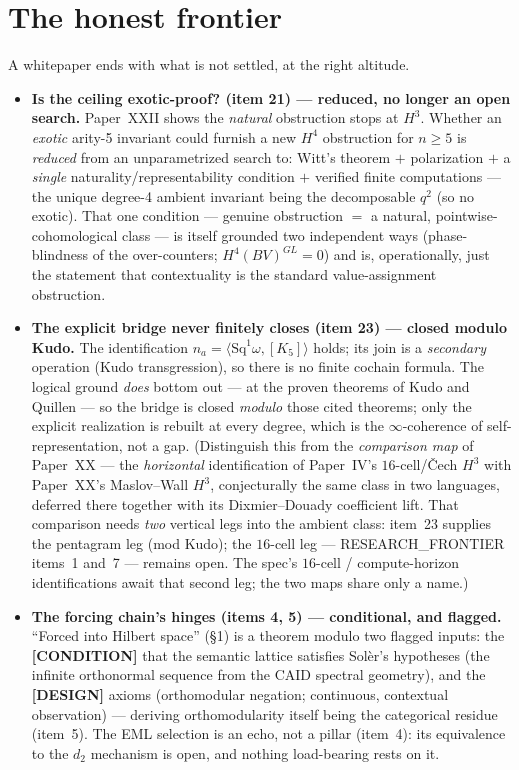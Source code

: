 \documentclass[11pt,a4paper]{article}
\newcommand{\Sq}{\mathrm{Sq}}
\theoremstyle{plain}
\theoremstyle{definition}
\theoremstyle{remark}
\begin{document}
\section{The honest frontier}
\label{sec:frontier}

A whitepaper ends with what is not settled, at the right altitude.

\begin{itemize}
  \item \textbf{Is the ceiling exotic-proof? (item 21) --- reduced, no longer an
  open search.} Paper~XXII shows the \emph{natural} obstruction stops at $H^3$.
  Whether an \emph{exotic} arity-5 invariant could furnish a new $H^4$ obstruction
  for $n\ge5$ is \emph{reduced} from an unparametrized search to: Witt's theorem
  $+$ polarization $+$ a \emph{single} naturality/representability condition $+$
  verified finite computations --- the unique degree-4 ambient invariant being the
  decomposable $q^2$ (so no exotic). That one condition --- genuine obstruction $=$
  a natural, pointwise-cohomological class --- is itself grounded two independent
  ways (phase-blindness of the over-counters; $H^4(BV)^{GL}=0$) and is, operationally,
  just the statement that contextuality is the standard value-assignment obstruction.
  \item \textbf{The explicit bridge never finitely closes (item 23) --- closed
  modulo Kudo.} The identification $n_a=\langle\Sq^1\omega,[K_5]\rangle$ holds; its
  join is a \emph{secondary} operation (Kudo transgression), so there is no finite
  cochain formula. The logical ground \emph{does} bottom out --- at the proven
  theorems of Kudo and Quillen --- so the bridge is closed \emph{modulo} those
  cited theorems; only the explicit realization is rebuilt at every degree, which
  is the $\infty$-coherence of self-representation, not a gap. (Distinguish this
  from the \emph{comparison map} of Paper~XX --- the \emph{horizontal}
  identification of Paper~IV's $16$-cell/\v{C}ech $H^3$ with Paper~XX's
  Maslov--Wall $H^3$, conjecturally the same class in two languages, deferred
  there together with its Dixmier--Douady coefficient lift. That comparison
  needs \emph{two} vertical legs into the ambient class: item~23 supplies the
  pentagram leg (mod Kudo); the $16$-cell leg --- RESEARCH\_FRONTIER items~1
  and~7 --- remains open. The spec's $16$-cell / compute-horizon
  identifications await that second leg; the two maps share only a name.)
  \item \textbf{The forcing chain's hinges (items 4, 5) --- conditional, and
  flagged.} ``Forced into Hilbert space'' (\S1) is a theorem modulo two flagged
  inputs: the \textbf{[CONDITION]} that the semantic lattice satisfies
  Sol\`er's hypotheses (the infinite orthonormal sequence from the CAID
  spectral geometry), and the \textbf{[DESIGN]} axioms (orthomodular negation;
  continuous, contextual observation) --- deriving orthomodularity itself
  being the categorical residue (item~5). The EML selection is an echo, not a
  pillar (item~4): its equivalence to the $d_2$ mechanism is open, and nothing
  load-bearing rests on it.
\end{itemize}
\end{document}
